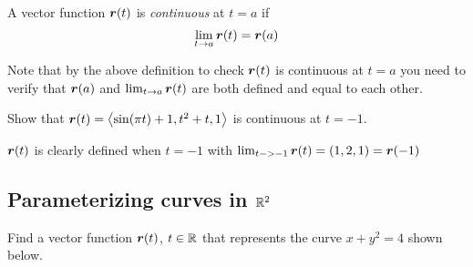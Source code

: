 \documentclass[12pt]{exam}
\newcommand{\bif}{\quad\iff\quad}
\begin{document}
\begin{questions}
\newpage 

\begin{definition}
    A vector function \(\bm{r}(t)\) is \emph{continuous} at \(t=a\) if 
        \[
            \lim_{t\to a} \bm{r}(t) = \bm{r}(a)
        \]
\end{definition}

    Note that by the above definition to check \(\bm{r}(t)\) is continuous at \(t=a\) you need to verify that \(\bm{r}(a)\) and \(\lim_{t\to a}\bm{r}(t)\) are both defined and equal to each other.


\question Show that \(\bm{r}(t)=\left\langle \sin(\pi t)+1,t^2+t,1 \right\rangle\) is continuous at \(t=-1\).
        \ifprintanswers
            \begin{solution}
                \(\bm{r}(t)\) is clearly defined when \(t=-1\) with \(\lim_{t->-1}\bm{r}(t)=(1,2,1)=\bm{r}(-1)\)
            \end{solution}
        \else
            \vfill
        \fi

\subsection*{Parameterizing curves in \(\mathbb{R}^2\)}

\question Find a vector function \(\bm{r}(t)\), \(t\in \mathbb{R}\) that represents the curve 
 \(
    x+y^2 = 4
 \) shown below.

\begin{center}
 \end{center}

 
\end{questions}
\end{document}
